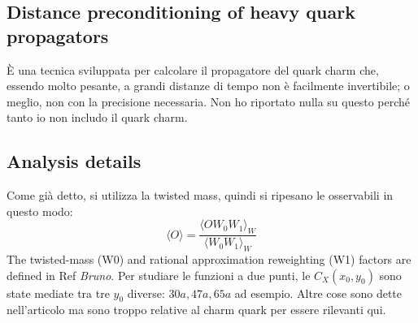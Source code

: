 \documentclass[12pt,a4paper,openright]{article}
\newcommand{\la}{\langle}
\newcommand{\ra}{\rangle}
\begin{document}
\subsection{Distance preconditioning of heavy quark propagators}
È una tecnica sviluppata per calcolare il propagatore del quark charm che, essendo molto pesante, a grandi distanze di tempo non è facilmente invertibile; o meglio, non con la precisione necessaria.
Non ho riportato nulla su questo perché tanto io non includo il quark charm.

\subsection{Analysis details}
Come già detto, si utilizza la twisted mass, quindi si ripesano le osservabili in questo modo:
\begin{equation*}
  \la O \ra = \frac{\la OW_0W_1 \ra_{W}}{\la W_0 W_1 \ra_{W}}
\end{equation*}
The twisted-mass (W0) and rational approximation reweighting (W1) factors are defined in Ref \textit{Bruno}.
Per studiare le funzioni a due punti, le $C_X(x_0, y_0)$ sono state mediate tra tre $y_0$ diverse: $30a,47a,65a$ ad esempio.
\newline \newline
Altre cose sono dette nell'articolo ma sono troppo relative al charm quark per essere rilevanti qui.


\newpage
\end{document}
